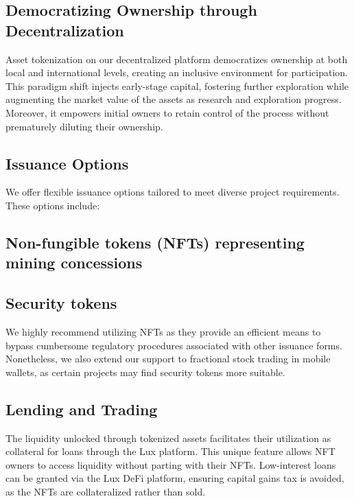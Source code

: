 \documentclass[11pt]{article}
\begin{document}
\subsection{Democratizing Ownership through Decentralization}

Asset tokenization on our decentralized platform democratizes ownership at both local and international levels, creating an inclusive environment for participation. This paradigm shift injects early-stage capital, fostering further exploration while augmenting the market value of the assets as research and exploration progress. Moreover, it empowers initial owners to retain control of the process without prematurely diluting their ownership.


\subsection{Issuance Options}

We offer flexible issuance options tailored to meet diverse project requirements. These options include:


\subsection{Non-fungible tokens (NFTs) representing mining concessions}

\subsection{Security tokens}

We highly recommend utilizing NFTs as they provide an efficient means to bypass cumbersome regulatory procedures associated with other issuance forms. Nonetheless, we also extend our support to fractional stock trading in mobile wallets, as certain projects may find security tokens more suitable.


\subsection{Lending and Trading}

The liquidity unlocked through tokenized assets facilitates their utilization as collateral for loans through the Lux platform. This unique feature allows NFT owners to access liquidity without parting with their NFTs. Low-interest loans can be granted via the Lux DeFi platform, ensuring capital gains tax is avoided, as the NFTs are collateralized rather than sold.
\end{document}
